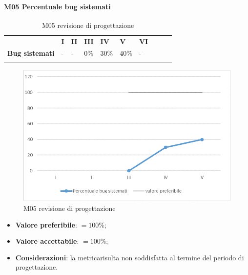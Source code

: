 \paragraph{M05 Percentuale bug sistemati} \mbox{}
\begin{longtable}[H!] {						
		>{}p{50mm}  		
		>{}p{8mm}
		>{}p{8mm}		
		>{}p{8mm}		
		>{}p{8mm}		
		>{}p{8mm}		
		>{}p{8mm}
		>{}p{8mm}
		>{}p{8mm}
		>{}p{8mm}
	}
	\rowcolor{gray!50}
	\textbf{} & \textbf{I} & \textbf{II} & \textbf{III} & \textbf{IV} & \textbf{V} & \textbf{VI} \TBstrut \\ [2mm]
	\textbf{Bug sistemati} & - & - & 0\% & 30\% & 40\% & - \TBstrut \\ [2mm]
	\rowcolor{white}
	\caption{M05 revisione di progettazione\glo}
\end{longtable}
\begin{figure}[H] 	
\includegraphics[width=\linewidth]{./img/grafici/RP16.png}	
\caption{M05 revisione di progettazione\glo}	
\end{figure}
\begin{itemize}
	\item \textbf{Valore preferibile}: $=100\%$;
	\item \textbf{Valore accettabile}: $=100\%$;
	\item \textbf{Considerazioni}: la metrica\glosp risulta non soddisfatta al termine del periodo di progettazione\glo.
\end{itemize}
